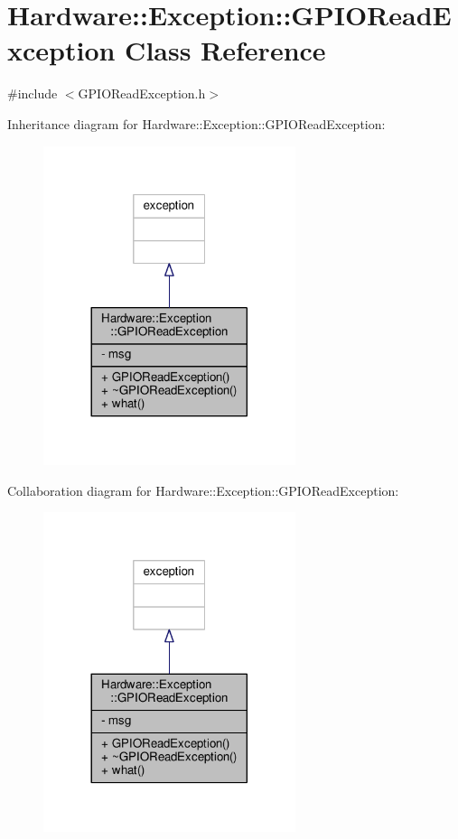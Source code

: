 \hypertarget{class_hardware_1_1_exception_1_1_g_p_i_o_read_exception}{}\section{Hardware\+:\+:Exception\+:\+:G\+P\+I\+O\+Read\+Exception Class Reference}
\label{class_hardware_1_1_exception_1_1_g_p_i_o_read_exception}


{\ttfamily \#include $<$G\+P\+I\+O\+Read\+Exception.\+h$>$}



Inheritance diagram for Hardware\+:\+:Exception\+:\+:G\+P\+I\+O\+Read\+Exception\+:\nopagebreak
\begin{figure}[H]
\begin{center}
\leavevmode
\includegraphics[width=209pt]{class_hardware_1_1_exception_1_1_g_p_i_o_read_exception__inherit__graph}
\end{center}
\end{figure}


Collaboration diagram for Hardware\+:\+:Exception\+:\+:G\+P\+I\+O\+Read\+Exception\+:\nopagebreak
\begin{figure}[H]
\begin{center}
\leavevmode
\includegraphics[width=209pt]{class_hardware_1_1_exception_1_1_g_p_i_o_read_exception__coll__graph}
\end{center}
\end{figure}

